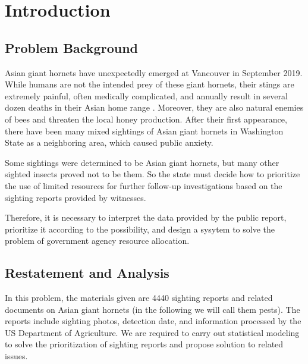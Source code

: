 \section{Introduction}        
\subsection{Problem Background}%
Asian giant hornets have unexpectedly emerged at Vancouver in September 2019. While humans are not the intended prey of these giant hornets, their stings are extremely painful, often medically complicated, and annually result in several dozen deaths in their Asian home range \parencite{1RSSL}. Moreover, they are also natural enemies of bees and threaten the local honey production. After their first appearance, there have been many mixed sightings of Asian giant hornets in Washington State as a neighboring area, which caused public anxiety.

Some sightings were determined to be Asian giant hornets, but many other sighted insects proved not to be them. So the state must decide how to prioritize the use of limited resources for further follow-up investigations based on the sighting reports provided by witnesses.

Therefore, it is necessary to interpret the data provided by the public report, prioritize it according to the possibility, and design a sysytem to solve the problem of government agency resource allocation.

\subsection{Restatement and Analysis}
In this problem, the materials given are 4440 sighting reports and related documents on Asian giant hornets (in the following we will call them pests). The reports include sighting photos, detection date, and information processed by the US Department of Agriculture. We are required to carry out statistical modeling to solve the prioritization of sighting reports and propose solution to related issues.


